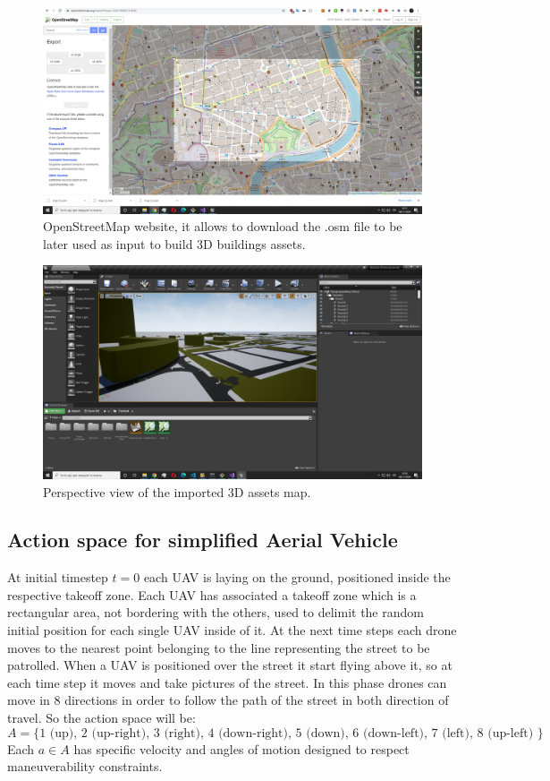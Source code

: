 \documentclass[LaM,binding=0.6cm]{sapthesis}
\begin{document}
\begin{figure}[hb!]
	\centering
	\includegraphics[width=1.0\columnwidth]{figures/Cattura3.PNG}
	\caption{OpenStreetMap website, it allows to download the .osm file to be later used as input to build 3D buildings assets.}
\end{figure}
\begin{figure}[!]
	\centering
	\includegraphics[width=1.0\columnwidth]{figures/Cattura5.PNG}
	\caption{Perspective view of the imported 3D assets map.}
\end{figure}


\subsection*{Action space for simplified Aerial Vehicle}
At initial timestep $t=0$ each UAV is laying on the ground, positioned inside the respective takeoff zone. Each UAV has associated a takeoff zone which is a rectangular area, not bordering with the others, used to delimit the random initial position for each single UAV inside of it.
At the next time steps each drone moves to the nearest point belonging to the line representing the street to be patrolled.
When a UAV is positioned over the street it start flying above it, so at each time step it moves and take pictures of the street. In this phase drones can move in 8 directions in order to follow the path of the street in both direction of travel. So the action space will be: 
$$ A = \{ 1 \mbox{ (up), }
2 \mbox{ (up-right), }
3 \mbox{ (right), } 
4 \mbox{ (down-right), }
5\mbox{ (down), }
6 \mbox{ (down-left), }
7 \mbox{ (left), } 
8 \mbox{ (up-left) }
\}$$
Each $a \in A$ has specific velocity and angles of motion designed to respect maneuverability constraints.
\end{document}
